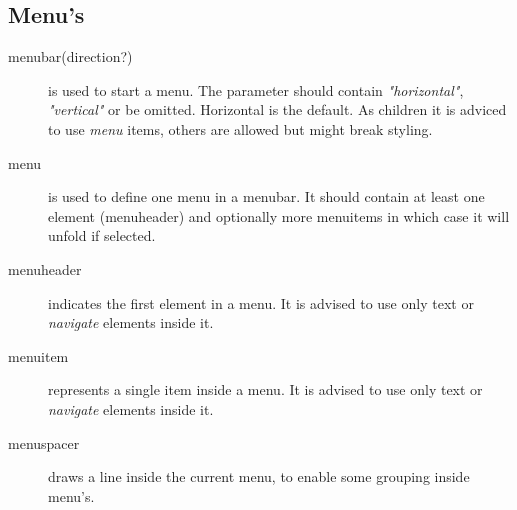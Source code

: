 \subsection{Menu's}
\begin{description}
	\item[menubar(direction?){}] is used to start a menu. The parameter should contain \emph{"horizontal"}, \emph{"vertical"} or be omitted. Horizontal is the default. As children it is adviced to use \emph{menu} items, others are allowed but might break styling. 
	\item[menu{}] is used to define one menu in a menubar. It should contain at least one element (menuheader) and optionally more menuitems in which case it will unfold if selected. 
	\item[menuheader{}] indicates the first element in a menu. It is advised to use only text or \emph{navigate} elements inside it. 
	\item[menuitem{}] represents a single item inside a menu.  It is advised to use only text or \emph{navigate} elements inside it. 
	\item[menuspacer] draws a line inside the current menu, to enable some grouping inside menu's. 
\end{description}

